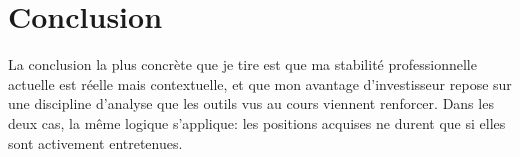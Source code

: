 \documentclass[12pt, a4paper]{article}
\begin{document}
\section{Conclusion}

La conclusion la plus concrète que je tire est que ma 
stabilité professionnelle actuelle est réelle mais 
contextuelle, et que mon avantage d'investisseur repose 
sur une discipline d'analyse que les outils vus au cours viennent 
renforcer. Dans les deux cas, la même logique s'applique: 
les positions acquises ne durent que si elles sont 
activement entretenues.


\end{document}
